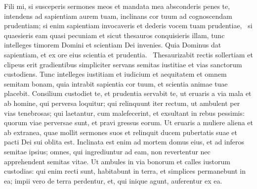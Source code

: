 \begin{biblechapter}
\begin{biblechapter}
 \verse Fili mi, si susceperis sermones meos
 et mandata mea absconderis penes te,
 \verse intendens ad sapientiam aurem tuam,
 inclinans cor tuum ad cognoscendam prudentiam;
 \verse si enim sapientiam invocaveris
 et dederis vocem tuam prudentiae, 
 \verse si quaesieris eam quasi pecuniam
 et sicut thesauros conquisieris illam,
 \verse tunc intelleges timorem Domini
 et scientiam Dei invenies.
 \verse Quia Dominus dat sapientiam,
 et ex ore eius scientia et prudentia. 
 \verse Thesaurizabit rectis sollertiam
 et clipeus erit gradientibus simpliciter
 \verse servans semitas iustitiae
 et vias sanctorum custodiens.
 \verse Tunc intelleges iustitiam et iudicium
 et aequitatem et omnem semitam bonam,
 \verse quia intrabit sapientia cor tuum,
 et scientia animae tuae placebit.
 \verse Consilium custodiet te,
 et prudentia servabit te,
 \verse ut eruaris a via mala
 et ab homine, qui perversa loquitur;
 \verse qui relinquunt iter rectum,
 ut ambulent per vias tenebrosas;
 \verse qui laetantur, cum malefecerint,
 et exsultant in rebus pessimis:
 \verse quorum viae perversae sunt,
 et pravi gressus eorum.
 \verse Ut eruaris a muliere aliena
 et ab extranea, quae mollit sermones suos
 \verse et relinquit ducem pubertatis suae
 et pacti Dei sui oblita est.
 \verse Inclinata est enim ad mortem domus eius,
 et ad inferos semitae ipsius;
 \verse omnes, qui ingrediuntur ad eam, non revertentur
 nec apprehendent semitas vitae.
 \verse Ut ambules in via bonorum
 et calles iustorum custodias:
 \verse qui enim recti sunt, habitabunt in terra,
 et simplices permanebunt in ea;
 \verse impii vero de terra perdentur,
 et, qui inique agunt, auferentur ex ea.
 

\end{biblechapter}
\end{biblechapter}

